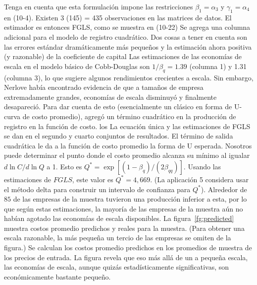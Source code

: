Tenga en cuenta que esta formulación impone las restricciones $\beta_{1} = \alpha_{3}$ y $\gamma_{1} = \alpha_{4}$ en (10-4). Existen 3 (145) = 435 observaciones en las matrices de datos. El estimador es entonces FGLS, como se muestra en (10-22) Se agrega una columna adicional para el modelo de registro cuadrático. Dos cosas a tener en cuenta son las
errores estándar dramáticamente más pequeños y la estimación ahora positiva (y razonable) de la coeficiente de capital Las estimaciones de las economías de escala en el modelo básico de Cobb-Douglas son
$1/\beta_{q}=1.39$ (columna 1) y 1.31 (columna 3), lo que sugiere algunos rendimientos crecientes a escala.
Sin embargo, Nerlove había encontrado evidencia de que a tamaños de empresa extremadamente grandes, economías de escala
disminuyó y finalmente desapareció. Para dar cuenta de esto (esencialmente un clásico en forma de U-curva de costo promedio), agregó un término cuadrático en la producción de registro en la función de costo. los La ecuación única y las estimaciones de FGLS se dan en el segundo y cuarto conjuntos de resultados.
El término de salida cuadrática le da a la función de costo promedio la forma de U esperada. Nosotros puede determinar el punto donde el costo promedio alcanza su mínimo al igualar $d\ln C/d\ln Q$ a 1. Esto es $Q^{\ast}=\exp\left[(1-\beta_{q})/(2\beta_{qq})\right]$. Usando las estimaciones de $FGLS$, este valor es $Q^{\ast}=4,669$.
(La aplicación 5 considera usar el método delta para construir un intervalo de confianza para $Q^{\ast}$).
Alrededor de $85$ de las empresas de la muestra tuvieron una producción inferior a esta, por lo que según estas estimaciones, la mayoría de las empresas de la muestra aún no habían agotado las economías de escala disponibles. La figura~\ref{fg:predicted} muestra costos promedio predichos y reales para la muestra. (Para obtener una escala razonable, la más pequeña
un tercio de las empresas se omiten de la figura.) Se calculan los costos promedio predichos en los promedios de muestra de los precios de entrada. La figura revela que eso más allá de un a pequeña escala, las economías de escala, aunque quizás estadísticamente significativas, son económicamente bastante pequeño.
